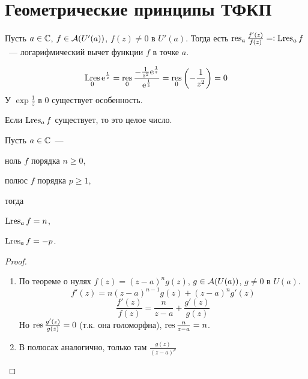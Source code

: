 \section{Геометрические принципы ТФКП}

\begin{definition}
Пусть $a \in \mathbb C$, $f \in \mathcal A(U'(a))$, $f(z) ≠ 0$ в $U'(a)$. Тогда есть $ \operatorname*{res}_a \frac{f'(z)}{f(z)} =: \operatorname*{Lres}_a f$ — логарифмический вычет функции $f$ в точке $a$.
\end{definition}

\begin{example}
	\[ \operatorname*{Lres}_0 {\operatorname{e}}^{\frac{1}{z}} = \operatorname*{res}_0 \frac{-\frac{1}{z^2}{\operatorname{e}}^{\frac{1}{z}}}{{\operatorname{e}}^{\frac{1}{z}}} = \operatorname*{res}_0\left(-\frac{1}{z^2}\right) = 0 \]
	У $\exp{\frac{1}{z}}$ в $0$ существует особенность.
\end{example}

\begin{exercise}
	Если $\operatorname*{Lres}_a f$ существует, то это целое число.
\end{exercise}

\begin{theorem}
	Пусть $a \in \mathbb C$ — 
	\begin{mylist}
		\item ноль $f$ порядка $n \geq 0$,
		\item полюс $f$ порядка $p \geq 1$,
	\end{mylist}
тогда
	\begin{mylist}
		\item $\operatorname*{Lres}_a f = n$,
		\item $\operatorname*{Lres}_a f = -p$.
	\end{mylist}
\end{theorem}
\begin{proof} ~\\
	\begin{enumerate}
		\item По теореме о нулях $f(z) = (z-a)^n g(z)$, $g \in \mathcal A(U(a))$, $g ≠0$ в $U(a)$.
		\[ f'(z) = n (z - a)^{n-1} g(z) + (z - a)^n g'(z) \]
		\[ \frac{f'(z)}{f(z)} = \frac{n}{z - a} + \frac{g'(z)}{g(z)} \]
		Но $\operatorname*{res} \frac{g'(z)}{g(z)} = 0$ (т.к. она голоморфна), $ \operatorname*{res} \frac{n}{z - a} = n$.
		\item В полюсах аналогично, только там $\frac{g(z)}{(z-a)^p}$
	\end{enumerate}
\end{proof}


